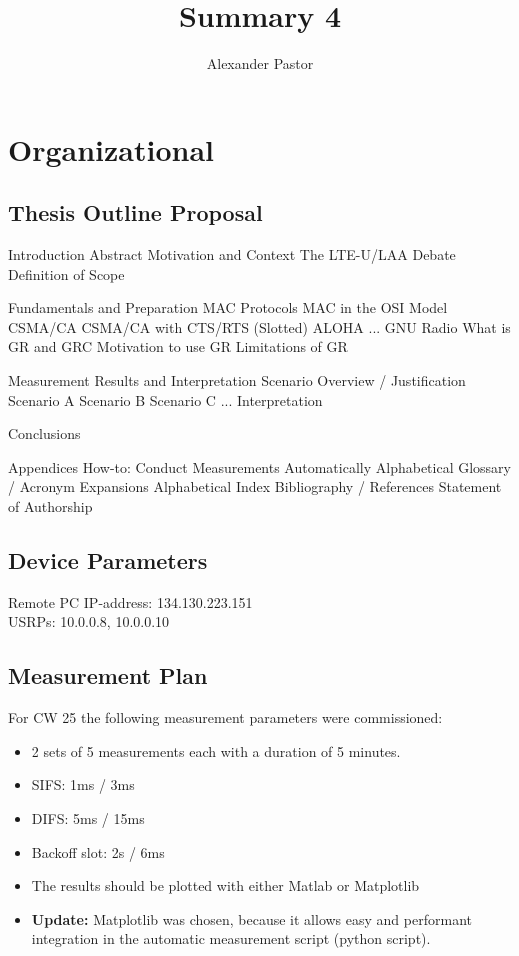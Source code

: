 \documentclass{article}
\begin{document}
	
\title{Summary 4}
\author{Alexander Pastor}
\maketitle
\tableofcontents
\newpage

\section{Organizational}

\subsection{Thesis Outline Proposal}

\begin{outline}[enumerate]
	\1 Introduction
		\2 Abstract
		\2 Motivation and Context
			\3 The LTE-U/LAA Debate 
			\3 Definition of Scope
		
	\1 Fundamentals and Preparation
		\2 MAC Protocols
			\3 MAC in the OSI Model
		 	\3 CSMA/CA
		 	\3 CSMA/CA with CTS/RTS
		 	\3 (Slotted) ALOHA
		 	\3 ...
		\2 GNU Radio 
			\3 What is GR and GRC
			\3 Motivation to use GR
			\3 Limitations of GR
	
	\1 Measurement Results and Interpretation
		\2 Scenario Overview / Justification
		\2 Scenario A
		\2 Scenario B
		\2 Scenario C
		\2 ...
		\2 Interpretation
		
	\1 Conclusions
	
	\1 Appendices
		\2 How-to: Conduct Measurements Automatically
		\2 Alphabetical Glossary / Acronym Expansions
		\2 Alphabetical Index
		\2 Bibliography / References
		\2 Statement of Authorship
\end{outline}

\subsection{Device Parameters}

Remote PC IP-address: 134.130.223.151 \\
USRPs: 10.0.0.8, 10.0.0.10

\subsection{Measurement Plan}

For CW 25 the following measurement parameters were commissioned:

\begin{itemize}
	\item 2 sets of 5 measurements each with a duration of 5 minutes.
	\item SIFS: 1ms / 3ms 
	\item DIFS: 5ms  / 15ms 
	\item Backoff slot: 2s / 6ms
	\item The results should be plotted with either Matlab or Matplotlib
	\item \textbf{Update:}  Matplotlib was chosen, because it allows easy and performant integration in the automatic measurement script (python script).
\end{itemize}
\end{document}
